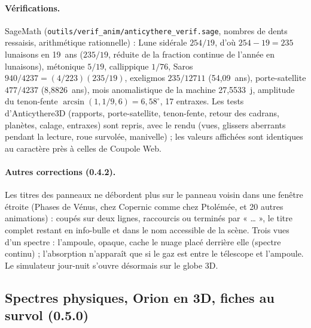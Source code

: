 \paragraph{Vérifications.} SageMath (\texttt{outils/verif\_anim/anticythere\_verif.sage}, nombres de dents ressaisis,
arithmétique rationnelle) : Lune sidérale $254/19$, d'où $254-19=235$ lunaisons en 19~ans ($235/19$, réduite de la
fraction continue de l'année en lunaisons), métonique $5/19$, callippique $1/76$, Saros $940/4237=(4/223)(235/19)$,
exeligmos $235/12711$ (54,09~ans), porte-satellite $477/4237$ (8,8826~ans), mois anomalistique de la machine
27,5533~j, amplitude du tenon-fente $\arcsin(1{,}1/9{,}6)=6{,}58^\circ$, 17 entraxes. Les tests d'Anticythere3D
(rapports, porte-satellite, tenon-fente, retour des cadrans, planètes, calage, entraxes) sont repris, avec le rendu
(vues, glissers aberrants pendant la lecture, roue survolée, manivelle) ; les valeurs affichées sont identiques au
caractère près à celles de Coupole Web.


\paragraph{Autres corrections (0.4.2).} Les titres des panneaux ne débordent plus sur le panneau voisin dans une
fenêtre étroite (Phases de Vénus, chez Copernic comme chez Ptolémée, et 20 autres animations) : coupés sur deux lignes,
raccourcis ou terminés par « … », le titre complet restant en info-bulle et dans le nom accessible de la scène. Trois
vues d'un spectre : l'ampoule, opaque, cache le nuage placé derrière elle (spectre continu) ; l'absorption n'apparaît
que si le gaz est entre le télescope et l'ampoule. Le simulateur jour-nuit s'ouvre désormais sur le globe 3D.

\subsection{Spectres physiques, Orion en 3D, fiches au survol (0.5.0)}\label{sec:orion}
